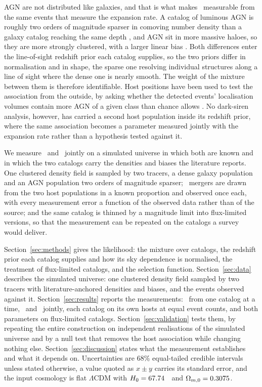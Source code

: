 AGN are not distributed like galaxies, and that is what makes \fagn\
measurable from the same events that measure the expansion rate. A catalog of
luminous AGN is roughly two orders of magnitude sparser in comoving number
density than a galaxy catalog reaching the same depth \citep{Ananna2022}, and
AGN sit in more massive haloes, so they are more strongly clustered, with a
larger linear bias \citep{Krumpe2010}. Both differences enter the
line-of-sight redshift prior each catalog supplies, so the two priors differ in
normalisation and in shape, the sparse one resolving individual structures
along a line of sight where the dense one is nearly smooth. The weight of the
mixture between them is therefore identifiable. Host positions have been used
to test the association from the outside, by asking whether the detected
events' localisation volumes contain more AGN of a given class than chance
allows \citep{Bartos2017NatComm, Veronesi2022, Veronesi2023}. No dark-siren
analysis, however, has carried a second host population inside its redshift
prior, where the same association becomes a parameter measured jointly with
the expansion rate rather than a hypothesis tested against it.

We measure \Hz\ and \fagn\ jointly on a simulated universe in which both are
known and in which the two catalogs carry the densities and biases the
literature reports. One clustered density field is sampled by two tracers, a
dense galaxy population and an AGN population two orders of magnitude sparser;
\EvNobs\ mergers are drawn from the two host populations in a known proportion
and observed once each, with every measurement error a function of the observed
data rather than of the source; and the same catalog is thinned by a magnitude
limit into flux-limited versions, so that the measurement can be repeated on
the catalogs a survey would deliver.

Section~\ref{sec:methods} gives the likelihood: the mixture over catalogs, the
redshift prior each catalog supplies and how its sky dependence is normalised,
the treatment of flux-limited catalogs, and the selection function.
Section~\ref{sec:data} describes the simulated universe: one clustered density
field sampled by two tracers with literature-anchored densities and biases, and
the events observed against it. Section~\ref{sec:results} reports the
measurements: \Hz\ from one catalog at a time, \Hz\ and \fagn\ jointly, each catalog on its own hosts at equal event
counts, and both parameters on flux-limited catalogs.
Section~\ref{sec:validation} tests them, by repeating the entire construction
on independent realisations of the simulated universe and by a null test that
removes the host association while changing nothing else.
Section~\ref{sec:discussion} states what the measurement establishes and what
it depends on. Uncertainties are 68\% equal-tailed credible intervals unless
stated otherwise, a value quoted as $x \pm y$ carries its standard error, and
the input cosmology is flat $\Lambda$CDM with
$H_0 = 67.74$~\kmsmpc\ and $\Omega_{m,0} = 0.3075$.
